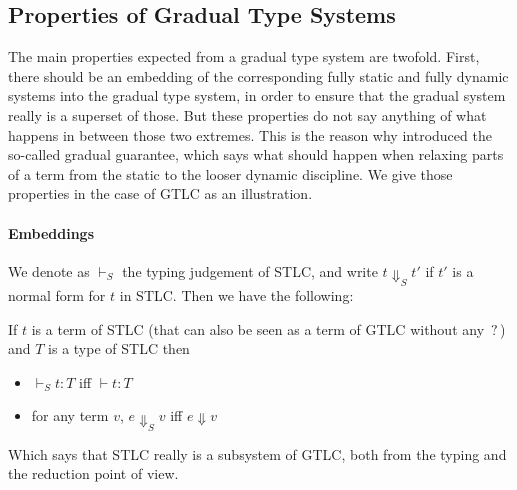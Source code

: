 \documentclass[en]{myarticle}
\newcommand{\red}{\mapsto}
\newcommand{\comp}{\rightsquigarrow}
\DeclareMathOperator{\?}{?}
\begin{document}
{%

\subsection{Properties of Gradual Type Systems}
\label{props}

The main properties expected from a gradual type system are twofold. First, there should be an embedding of the corresponding fully static and fully dynamic systems into the gradual type system, in order to ensure that the gradual system really is a superset of those. But these properties do not say anything of what happens in between those two extremes. This is the reason why \cite{Siek2015} introduced the so-called gradual guarantee, which says what should happen when relaxing parts of a term from the static to the looser dynamic discipline.
We give those properties in the case of GTLC as an illustration.

\paragraph{Embeddings}

We denote as $\vdash_S$ the typing judgement of STLC, and write $t \Downarrow_S t'$ if $t'$ is a normal form for $t$ in STLC. Then we have the following:

\begin{prop}
	If $t$ is a term of STLC (that can also be seen as a term of GTLC without any $\?$) and $T$ is a type of STLC then
	\begin{itemize}
		\item $ \vdash_S t : T$ iff $\vdash t : T$
		\item for any term $v$, $e \Downarrow_S v$ iff $e \Downarrow v$
	\end{itemize}
\end{prop}

Which says that STLC really is a subsystem of GTLC, both from the typing and the reduction point of view.

}
\end{document}

